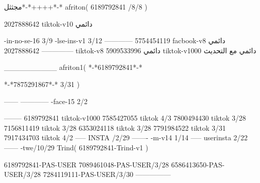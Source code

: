 مجثثل*-*++++*-*
afriton(
6189792841 /8/8
)

2027888642 tiktok-v10
دائمي

-in-no-se-16 3/9
-lse-ins-v1 3/12
------------
5754454119 facbook-v8
دائمي
--------------
2027888642 tiktok-v8
دائمي
5909533996 tiktok-v1000
دائمي مع التحديث

__________
afriton1(
*-*6189792841*-*

*-*7875291867*-* 3/31
)


------
------------
-face-15 2/2

--------
6189792841 tiktok-v1000
7585427055 tiktok 4/3
7800494430 tiktok 3/28
7156811419 tiktok 3/28
6353024118 tiktok 3/28
7791984522 tiktok 3/31
7917434703 tiktok 4/2
-----
 INSTA /2/29
-------
-m-v14 1/14
-----
userinsta 2/22
------
-twe/10/29
Trind(
6189792841-Trind-v1 
)

6189792841-PAS-USER
7089461048-PAS-USER/3/28
6586413650-PAS-USER/3/28
7284119111-PAS-USER/3/30
    ---------------
